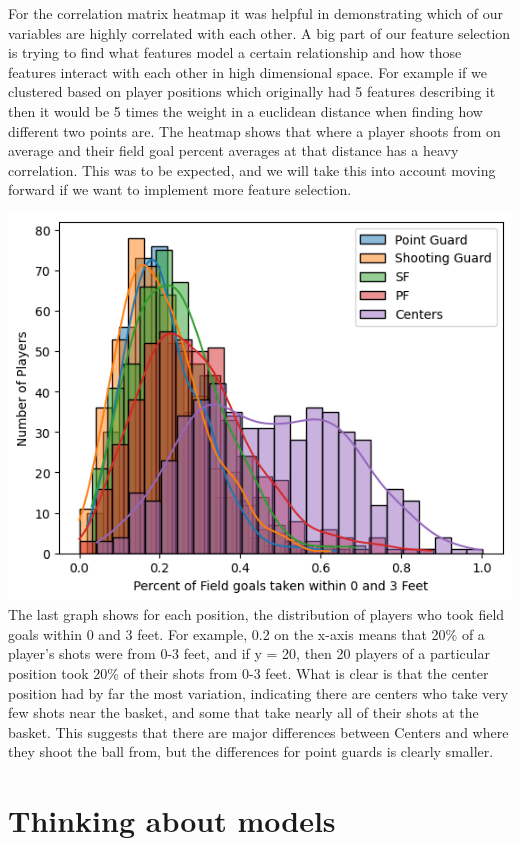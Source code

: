 \documentclass[12pt, letterpaper, titlepage]{article}
\begin{document}
For the correlation matrix heatmap it was helpful in demonstrating which of our variables are highly correlated with each other. A big part of our feature selection is trying to find what features model a certain relationship and how those features interact with each other in high dimensional space. For example if we clustered based on player positions which originally had 5 features describing it then it would be 5 times the weight in a euclidean distance when finding how different two points are. The heatmap shows that where a player shoots from on average and their field goal percent averages at that distance has a heavy correlation. This was to be expected, and we will take this into account moving forward if we want to implement more feature selection.

\includegraphics{0-3FT}
The last graph shows for each position, the distribution of players who took field goals within 0 and 3 feet.  For example, 0.2 on the x-axis means that 20\% of a player’s shots were from 0-3 feet, and if y = 20, then 20 players of a particular position took 20\% of their shots from 0-3 feet.  What is clear is that the center position had by far the most variation, indicating there are centers who take very few shots near the basket, and some that take nearly all of their shots at the basket.  This suggests that there are major differences between Centers and where they shoot the ball from, but the differences for point guards is clearly smaller.

\section{Thinking about models}
\end{document}
